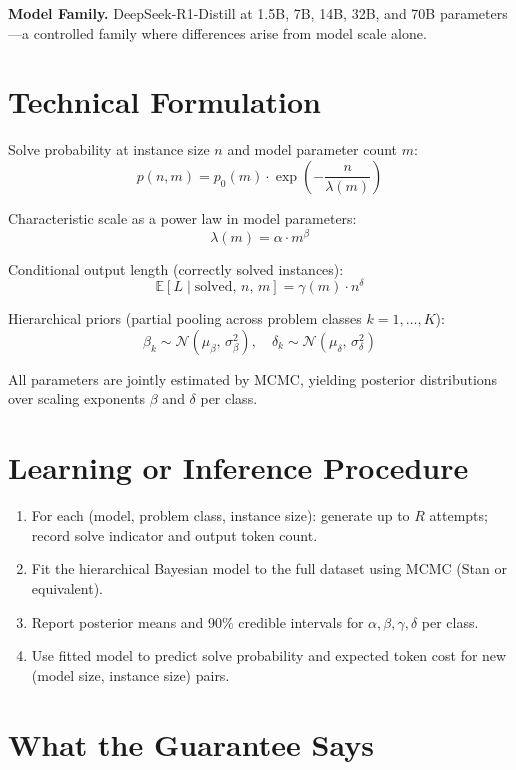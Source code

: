 \documentclass[10pt,twocolumn]{article}
\begin{document}
\textbf{Model Family.} DeepSeek-R1-Distill at 1.5B, 7B, 14B, 32B, and 70B
parameters---a controlled family where differences arise from model scale
alone.

\section{Technical Formulation}

Solve probability at instance size $n$ and model parameter count $m$:
\[
p(n, m) = p_0(m) \cdot \exp\!\left(-\frac{n}{\lambda(m)}\right)
\]

Characteristic scale as a power law in model parameters:
\[
\lambda(m) = \alpha \cdot m^\beta
\]

Conditional output length (correctly solved instances):
\[
\mathbb{E}[L \mid \text{solved},\, n,\, m]
= \gamma(m) \cdot n^{\delta}
\]

Hierarchical priors (partial pooling across problem classes $k=1,\ldots,K$):
\[
\beta_k \sim \mathcal{N}(\mu_\beta,\, \sigma_\beta^2),
\quad
\delta_k \sim \mathcal{N}(\mu_\delta,\, \sigma_\delta^2)
\]

All parameters are jointly estimated by MCMC, yielding posterior distributions
over scaling exponents $\beta$ and $\delta$ per class.

\section{Learning or Inference Procedure}

\begin{enumerate}[itemsep=2pt,parsep=0pt]
  \item For each (model, problem class, instance size): generate up to $R$
    attempts; record solve indicator and output token count.
  \item Fit the hierarchical Bayesian model to the full dataset using MCMC
    (Stan or equivalent).
  \item Report posterior means and 90\% credible intervals for
    $\alpha, \beta, \gamma, \delta$ per class.
  \item Use fitted model to predict solve probability and expected token cost
    for new (model size, instance size) pairs.
\end{enumerate}

\section{What the Guarantee Says}
\end{document}
